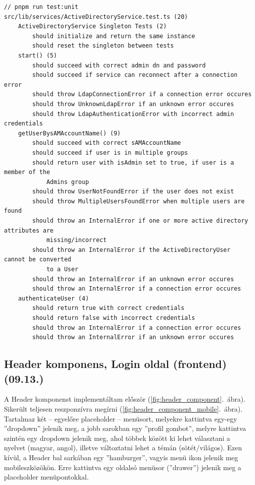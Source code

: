 \documentclass[a4paper]{article}
\begin{document}
\FloatBarrier
\begin{verbatim}
// pnpm run test:unit
src/lib/services/ActiveDirectoryService.test.ts (20)
    ActiveDirectoryService Singleton Tests (2)
        should initialize and return the same instance
        should reset the singleton between tests
    start() (5)
        should succeed with correct admin dn and password
        should succeed if service can reconnect after a connection error
        should throw LdapConnectionError if a connection error occures
        should throw UnknownLdapError if an unknown error occures
        should throw LdapAuthenticationError with incorrect admin credentials
    getUserBysAMAccountName() (9)
        should succeed with correct sAMAccountName
        should succeed if user is in multiple groups
        should return user with isAdmin set to true, if user is a member of the
            Admins group
        should throw UserNotFoundError if the user does not exist
        should throw MultipleUsersFoundError when multiple users are found
        should throw an InternalError if one or more active directory attributes are
            missing/incorrect
        should throw an InternalError if the ActiveDirectoryUser cannot be converted
            to a User
        should throw an InternalError if an unknown error occures
        should throw an InternalError if a connection error occures
    authenticateUser (4)
        should return true with correct credentials
        should return false with incorrect credentials
        should throw an InternalError if a connection error occures
        should throw an InternalError if an unknown error occures

\end{verbatim}

\subsection{Header komponens, Login oldal (frontend) (09.13.)}

A Header komponenst implementáltam először (\ref{fig:header_component}.~ábra). Sikerült teljesen
reszponzívra megírni (\ref{fig:header_component_mobile}.~ábra). Tartalmaz
két – egyelőre placeholder – menüsort, melyekre kattintva egy-egy ”dropdown” jelenik meg, a jobb
sarokban egy ”profil gombot”, melyre kattintva szintén egy dropdown jelenik meg, ahol többek között
ki lehet választani a nyelvet (magyar, angol), illetve változtatni lehet a témán (sötét/világos). Ezen
kívül, a Header bal sarkában egy ”hamburger”, vagyis menü ikon jelenik meg mobileszközökön. Erre
kattintva egy oldalsó menüsor (”drawer”) jelenik meg a placeholder menüpontokkal.
\end{document}
